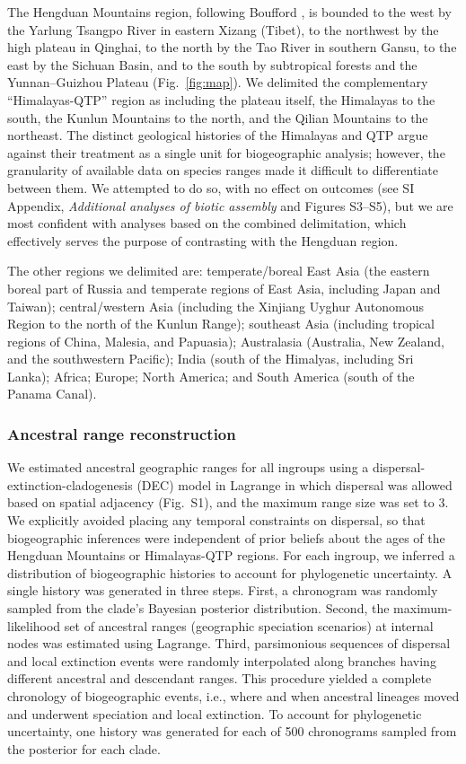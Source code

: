 \documentclass[9pt,twocolumn,twoside,lineno]{pnas-new}
\begin{document}
{The Hengduan Mountains region, following Boufford
\citep{Boufford2014}, is bounded to the west by the Yarlung Tsangpo
River in eastern Xizang (Tibet), to the northwest by the high plateau
in Qinghai, to the north by the Tao River in southern Gansu, to the
east by the Sichuan Basin, and to the south by subtropical forests and
the Yunnan–Guizhou Plateau (Fig.~\ref{fig:map}). We delimited the
complementary ``Himalayas-QTP'' region as including the plateau
itself, the Himalayas to the south, the Kunlun Mountains to the north,
and the Qilian Mountains to the northeast. The distinct geological
histories of the Himalayas and QTP argue against their treatment as a
single unit for biogeographic analysis; however, the granularity of
available data on species ranges made it difficult to differentiate
between them. We attempted to do so, with no effect on outcomes (see
SI Appendix, \textit{Additional analyses of biotic assembly} and
Figures S3--S5), but we are most confident with analyses based on the
combined delimitation, which effectively serves the purpose of
contrasting with the Hengduan region.

The other regions we delimited are: temperate/boreal East Asia (the
eastern boreal part of Russia and temperate regions of East Asia,
including Japan and Taiwan); central/western Asia (including the
Xinjiang Uyghur Autonomous Region to the north of the Kunlun Range);
southeast Asia (including tropical regions of China, Malesia, and
Papuasia); Australasia (Australia, New Zealand, and the southwestern
Pacific); India (south of the Himalyas, including Sri Lanka); Africa;
Europe; North America; and South America (south of the Panama Canal).

\subsubsection*{Ancestral range reconstruction}

We estimated ancestral geographic ranges for all ingroups using a
dispersal-extinction-cladogenesis (DEC) model in Lagrange
\citep{Ree2005,Ree2008} in which dispersal was allowed based on
spatial adjacency (Fig.~S1), and the maximum range size was set to
3. We explicitly avoided placing any temporal constraints on
dispersal, so that biogeographic inferences were independent of prior
beliefs about the ages of the Hengduan Mountains or Himalayas-QTP
regions. For each ingroup, we inferred a distribution of biogeographic
histories to account for phylogenetic uncertainty. A single history
was generated in three steps. First, a chronogram was randomly sampled
from the clade's Bayesian posterior distribution. Second, the
maximum-likelihood set of ancestral ranges (geographic speciation
scenarios) at internal nodes was estimated using Lagrange. Third,
parsimonious sequences of dispersal and local extinction events were
randomly interpolated along branches having different ancestral and
descendant ranges. This procedure yielded a complete chronology of
biogeographic events, i.e., where and when ancestral lineages moved
and underwent speciation and local extinction. To account for
phylogenetic uncertainty, one history was generated for each of 500
chronograms sampled from the posterior for each clade.

}
\end{document}
